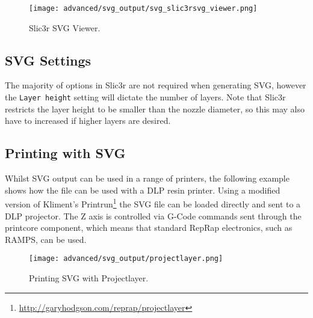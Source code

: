 \begin{figure}[H]
\centering
\texttt{[image: advanced/svg\_output/svg\_slic3rsvg\_viewer.png]}
\caption{Slic3r SVG Viewer.}
\label{fig:svg_slic3rsvg_viewer}
\end{figure}

\subsection{SVG Settings} %
\label{sub:svg_settings}

The majority of options in Slic3r are not required when generating SVG, however the \texttt{Layer height} setting will dictate the number of layers.  Note that Slic3r restricts the layer height to be smaller than the nozzle diameter, so this may also have to increased if higher layers are desired.


\subsection{Printing with SVG} %
\label{sub:printing_with_svg}

Whilst SVG output can be used in a range of printers, the following example shows how the file can be used with a DLP resin printer.  Using a modified version of Kliment's Printrun\footnote{\url{http://garyhodgson.com/reprap/projectlayer}} the SVG file can be loaded directly and sent to a DLP projector.  The Z axis is controlled via G-Code commands sent through the printcore component, which means that standard RepRap electronics, such as RAMPS, can be used.


\begin{figure}[H]
\centering
\texttt{[image: advanced/svg\_output/projectlayer.png]}
\caption{Printing SVG with Projectlayer.}
\label{fig:projectlayer}
\end{figure}



